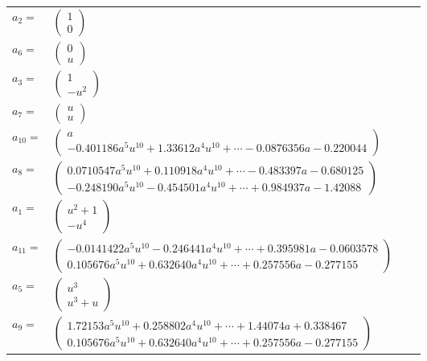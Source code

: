 \documentclass[1p]{elsarticle_modified}
\theoremstyle{definition}
\begin{document}
\begin{tabular}{m{7pt} m{180pt} m{7pt} m{180pt} }
\flushright $a_{2}=$&$\begin{pmatrix}1\\0\end{pmatrix}$ \\
\flushright $a_{6}=$&$\begin{pmatrix}0\\u\end{pmatrix}$ \\
\flushright $a_{3}=$&$\begin{pmatrix}1\\- u^2\end{pmatrix}$ \\
\flushright $a_{7}=$&$\begin{pmatrix}u\\u\end{pmatrix}$ \\
\flushright $a_{10}=$&$\begin{pmatrix}a\\-0.401186 a^{5} u^{10}+1.33612 a^{4} u^{10}+\cdots-0.0876356 a-0.220044\end{pmatrix}$ \\
\flushright $a_{8}=$&$\begin{pmatrix}0.0710547 a^{5} u^{10}+0.110918 a^{4} u^{10}+\cdots-0.483397 a-0.680125\\-0.248190 a^{5} u^{10}-0.454501 a^{4} u^{10}+\cdots+0.984937 a-1.42088\end{pmatrix}$ \\
\flushright $a_{1}=$&$\begin{pmatrix}u^2+1\\- u^4\end{pmatrix}$ \\
\flushright $a_{11}=$&$\begin{pmatrix}-0.0141422 a^{5} u^{10}-0.246441 a^{4} u^{10}+\cdots+0.395981 a-0.0603578\\0.105676 a^{5} u^{10}+0.632640 a^{4} u^{10}+\cdots+0.257556 a-0.277155\end{pmatrix}$ \\
\flushright $a_{5}=$&$\begin{pmatrix}u^3\\u^3+u\end{pmatrix}$ \\
\flushright $a_{9}=$&$\begin{pmatrix}1.72153 a^{5} u^{10}+0.258802 a^{4} u^{10}+\cdots+1.44074 a+0.338467\\0.105676 a^{5} u^{10}+0.632640 a^{4} u^{10}+\cdots+0.257556 a-0.277155\end{pmatrix}$ \\

\end{tabular}
\end{document}
